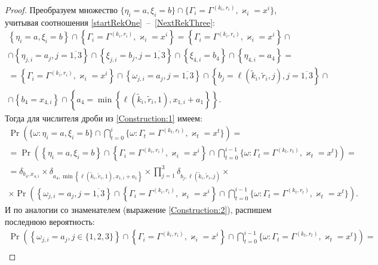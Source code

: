 \documentclass[a4paper,12pt,russian]{extarticle}
\begin{document}
\begin{proof}
Преобразуем множество $\{ \eta_i = a, \xi_i=b \} \cap \{\Gamma_i=\Gamma^{(k_i,r_i)}, \varkappa_i=x^i\}$, учитывая соотношения \eqref{startRekOne}~--~\eqref{NextRekThree}:
\begin{multline*}
\left\{ \eta_i = a, \xi_i=b \right\} \cap \left\{\Gamma_i=\Gamma^{(k_i,r_i)}, \varkappa_i=x^i\right\} = \left\{\Gamma_i=\Gamma^{(k_i,r_i)}, \varkappa_i=x^i\right\} \cap\\
\cap \left\{ \eta_{j,i} = a_j, j=\overline{1,3}\right\} \cap \left\{ \xi_{j,i} = b_j, j=\overline{1,3}\right\} \cap \left\{ \xi_{4,i} = b_4 \right\} \cap  \left\{ \eta_{4,i} = a_4 \right\} = \\
= \left\{\Gamma_i=\Gamma^{(k_i,r_i)}, \varkappa_i=x^i\right\} \cap \left\{ \omega_{j,i} = a_j, j= \overline{1,3}\right\} \cap \left\{ b_j=\ell(\tilde{k}_i,\tilde{r}_i,j), j=\overline{1,3}\right\} \cap \\ 
\cap \left\{ b_4 = x_{4,i} \right\} \cap  \left\{ a_4=\min\left\{\ell(\tilde{k}_i,\tilde{r}_i,1), x_{1,i}+a_1\right\} \right\}. 
\end{multline*}
Тогда для числителя дроби из \eqref{Construction:1} имеем:
\begin{multline}
\Pr\left(\{ \omega \colon \eta_i = a, \xi_i=b \} \cap \bigcap_{t=0}^{i}\{\omega\colon \Gamma_t=\Gamma^{(k_t,r_t)}, \varkappa_t=x^t\}\right)=\\
= \Pr\left(\left\{ \eta_i = a, \xi_i=b \right\} \cap \left\{\Gamma_i=\Gamma^{(k_i,r_i)}, \varkappa_i=x^i\right\} \cap \bigcap_{t=0}^{i-1}\{\omega\colon \Gamma_t=\Gamma^{(k_t,r_t)}, \varkappa_t=x^t\}\right)=\\
= \delta_{b_4,x_{4,i}} \times \delta_{a_4,\min\left\{\ell(\tilde{k}_i,\tilde{r}_i,1), x_{1,i}+a_1\right\}} \times \prod_{j=1}^3\delta_{b_j,\ell(\tilde{k}_i,\tilde{r}_i,j)}   \times \\
\times \Pr\left( \left\{ \omega_{j,i} = a_j, j=\overline{1,3}\right\} \cap \left\{\Gamma_i=\Gamma^{(k_i,r_i)}, \varkappa_i=x^i\right\} \cap \bigcap_{t=0}^{i-1}\{\omega\colon \Gamma_t=\Gamma^{(k_t,r_t)}, \varkappa_t=x^t\}\right).
\label{Construction:3}
\end{multline}
И по аналогии со знаменателем (выражение \eqref{Construction:2}), распишем последнюю вероятность:
\begin{multline*}
\Pr\left( \left\{ \omega_{j,i} = a_j, j\in \{1, 2, 3\}\right\} \cap \left\{\Gamma_i=\Gamma^{(k_i,r_i)}, \varkappa_i=x^i\right\} \cap \bigcap_{t=0}^{i-1}\{\omega\colon \Gamma_t=\Gamma^{(k_t,r_t)}, \varkappa_t=x^t\}\right) =\\

\end{multline*}
\end{proof}
\end{document}
